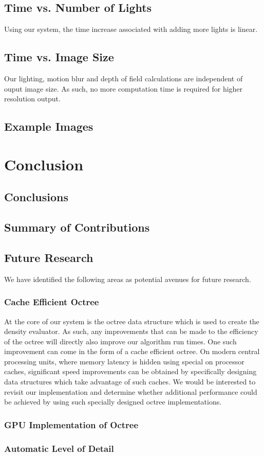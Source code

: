 \documentclass{article}
\begin{document}
\subsection{Time vs. Number of Lights}

Using our system, the time increase associated with adding more lights is linear.

\subsection{Time vs. Image Size}

Our lighting, motion blur and depth of field calculations are independent of ouput image size. As such, no more computation time is required for higher resolution output.

\subsection{Example Images}

\section{Conclusion}

\subsection{Conclusions}



\subsection{Summary of Contributions}

\subsection{Future Research}

We have identified the following areas as potential avenues for future research.

\subsubsection{Cache Efficient Octree}

At the core of our system is the octree data structure which is used to create the density evaluator. As such, any improvements that can be made to the efficiency of the octree will directly also improve our algorithm run times. One such improvement can come in the form of a cache efficient octree. On modern central processing units, where memory latency is hidden using special on processor caches, significant speed improvements can be obtained by specifically designing data structures which take advantage of such caches. We would be interested to revisit our implementation and determine whether additional performance could be achieved by using such specially designed octree implementations.

\subsubsection{GPU Implementation of Octree}

\subsubsection{Automatic Level of Detail}



\pagebreak[4]
{}

\end{document}
